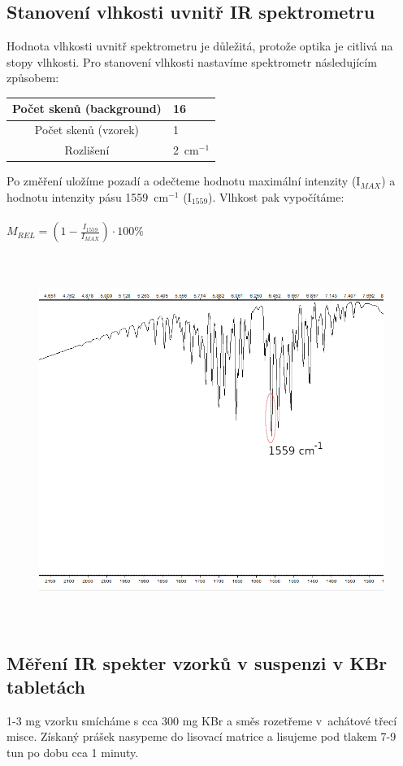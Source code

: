 \documentclass[12pt]{article}
\begin{document}
\subsection{Stanovení vlhkosti uvnitř IR spektrometru}
Hodnota vlhkosti uvnitř spektrometru je důležitá, protože optika je citlivá na stopy vlhkosti. Pro stanovení vlhkosti nastavíme spektrometr následujícím způsobem:

\begin{tabular}{|c|l|}
	\hline
	Počet skenů (background) & 16 \\\hline
	Počet skenů (vzorek) & 1 \\\hline
	Rozlišení & 2~cm$^{-1}$ \\\hline
\end{tabular}

Po změření uložíme pozadí a odečteme hodnotu maximální intenzity (I$_{MAX}$) a hodnotu intenzity pásu 1559~cm$^{-1}$ (I$_{1559}$). Vlhkost pak vypočítáme:
\\
\\
$M_{REL} = (1 - \frac{I_{1559}}{I_{MAX}}) \cdot 100 \%$

\begin{figure}[h]
	\includegraphics[keepaspectratio,height=12cm]{img/moisture.png}
\end{figure}

\newpage

\subsection{Měření IR spekter vzorků v suspenzi v KBr tabletách}
	1-3 mg vzorku smícháme s cca 300 mg KBr a směs rozetřeme v~achátové třecí misce. Získaný prášek nasypeme do lisovací matrice a lisujeme pod tlakem 7-9 tun po dobu cca 1 minuty.
\end{document}
